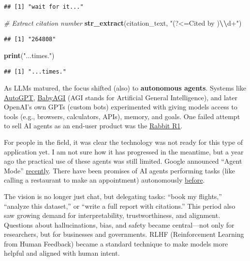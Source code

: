 \documentclass[
]{book}
\newenvironment{Shaded}{\begin{snugshade}}{\end{snugshade}}
\newcommand{\CommentTok}[1]{\textcolor[rgb]{0.56,0.35,0.01}{\textit{#1}}}
\newcommand{\FunctionTok}[1]{\textcolor[rgb]{0.13,0.29,0.53}{\textbf{#1}}}
\newcommand{\NormalTok}[1]{#1}
\newcommand{\SpecialCharTok}[1]{\textcolor[rgb]{0.81,0.36,0.00}{\textbf{#1}}}
\newcommand{\StringTok}[1]{\textcolor[rgb]{0.31,0.60,0.02}{#1}}
\begin{document}
\begin{verbatim}
## [1] "wait for it..."
\end{verbatim}

\begin{Shaded}
\begin{Highlighting}[]
\CommentTok{\# Extract citation number}
\FunctionTok{str\_extract}\NormalTok{(citation\_text, }\StringTok{"(?\textless{}=Cited by )}\SpecialCharTok{\textbackslash{}\textbackslash{}}\StringTok{d+"}\NormalTok{)}
\end{Highlighting}
\end{Shaded}

\begin{verbatim}
## [1] "264808"
\end{verbatim}

\begin{Shaded}
\begin{Highlighting}[]
\FunctionTok{print}\NormalTok{(}\StringTok{"...times."}\NormalTok{)}
\end{Highlighting}
\end{Shaded}

\begin{verbatim}
## [1] "...times."
\end{verbatim}

As LLMs matured, the focus shifted (also) to \textbf{autonomous agents}.
Systems like \href{https://agpt.co/}{AutoGPT},
\href{https://babyagi.org/}{BabyAGI} (AGI stands for Artificial General Intelligence),
and later OpenAI's own GPTs (custom bots) experimented with
giving models access to tools (e.g., browsers, calculators, APIs), memory, and goals.
One failed attempt to sell AI agents as an end-user product was
the \href{https://www.youtube.com/watch?v=ddTV12hErTc&ab_channel=MarquesBrownlee}{Rabbit R1}.

For people in the field, it was clear the technology was not ready for this type of application yet.
I am not sure how it has progressed in the meantime, but a year ago the practical use of these
agents was still limited.
Google announced ``Agent Mode'' \href{https://www.youtube.com/watch?v=LxvErFkBXPk&ab_channel=Google}{recently}.
There have been promises of AI agents performing tasks
(like calling a restaurant to make an appointment) autonomously \href{https://www.youtube.com/watch?v=D5VN56jQMWM&ab_channel=JeffGrubb\%27sGameMess}{before}.

The vision is no longer just chat, but delegating tasks: ``book my flights,'' ``analyze this dataset,'' or
``write a full report with citations.''
This period also saw growing demand for interpretability, trustworthiness, and alignment.
Questions about hallucinations, bias, and safety became central---not only for researchers,
but for businesses and governments. RLHF (Reinforcement Learning from Human Feedback) became a
standard technique to make models more helpful and aligned with human intent.
\end{document}

